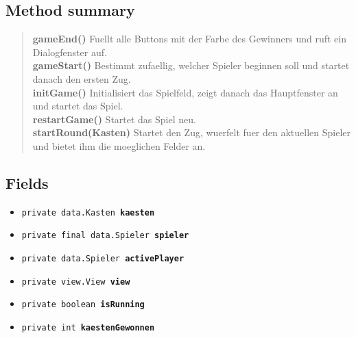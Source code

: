 \documentclass[11pt,a4paper]{report}
\begin{document}
{{{{\subsection{Method summary}{
\begin{verse}
{\bf gameEnd()} Fuellt alle Buttons mit der Farbe des Gewinners und ruft ein Dialogfenster auf.\\
{\bf gameStart()} Bestimmt zufaellig, welcher Spieler beginnen soll und startet danach den ersten Zug.\\
{\bf initGame()} Initialisiert das Spielfeld, zeigt danach das Hauptfenster an und startet das Spiel.\\
{\bf restartGame()} Startet das Spiel neu.\\
{\bf startRound(Kasten\lbrack \rbrack )} Startet den Zug, wuerfelt fuer den aktuellen Spieler und bietet ihm die moeglichen Felder an.\\
\end{verse}
}
\subsection{Fields}{
\begin{itemize}
\item{
\label{control.Spiel.kaesten}\texttt{private data.Kasten\lbrack \rbrack \ {\bf  kaesten}}
}
\item{
\label{control.Spiel.spieler}\texttt{private final data.Spieler\lbrack \rbrack \ {\bf  spieler}}
}
\item{
\label{control.Spiel.activePlayer}\texttt{private data.Spieler\ {\bf  activePlayer}}
}
\item{
\label{control.Spiel.view}\texttt{private view.View\ {\bf  view}}
}
\item{
\label{control.Spiel.isRunning}\texttt{private boolean\ {\bf  isRunning}}
}
\item{
\label{control.Spiel.kaestenGewonnen}\texttt{private int\ {\bf  kaestenGewonnen}}
}
\end{itemize}
}
}}}}
\end{document}
